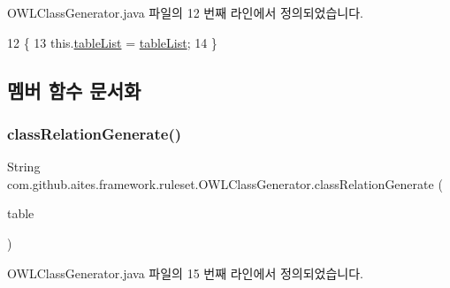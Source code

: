 O\+W\+L\+Class\+Generator.\+java 파일의 12 번째 라인에서 정의되었습니다.


\begin{DoxyCode}
12                                                            \{
13         this.\mbox{\hyperlink{classcom_1_1github_1_1aites_1_1framework_1_1ruleset_1_1_o_w_l_class_generator_a994d90ead25bc6713618ff0dbff19445}{tableList}} = \mbox{\hyperlink{classcom_1_1github_1_1aites_1_1framework_1_1ruleset_1_1_o_w_l_class_generator_a994d90ead25bc6713618ff0dbff19445}{tableList}};
14     \}
\end{DoxyCode}


\subsection{멤버 함수 문서화}
\mbox{\label{classcom_1_1github_1_1aites_1_1framework_1_1ruleset_1_1_o_w_l_class_generator_a4082d2b8575df9309689edeb347c115f}} 
\subsubsection{\texorpdfstring{class\+Relation\+Generate()}{classRelationGenerate()}}
{\footnotesize\ttfamily String com.\+github.\+aites.\+framework.\+ruleset.\+O\+W\+L\+Class\+Generator.\+class\+Relation\+Generate (\begin{DoxyParamCaption}\item[{\mbox{\hyperlink{classcom_1_1github_1_1aites_1_1framework_1_1dbcomponent_1_1_d_b_table}{D\+B\+Table}}}]{table }\end{DoxyParamCaption})}



O\+W\+L\+Class\+Generator.\+java 파일의 15 번째 라인에서 정의되었습니다.


